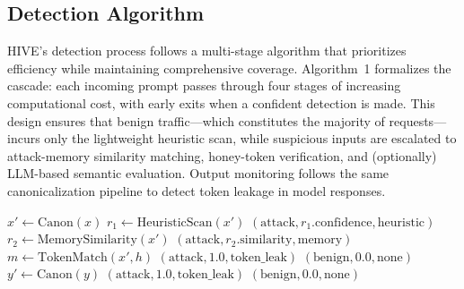 \documentclass[manuscript,screen,review]{acmart}
\begin{document}
\subsection{Detection Algorithm}
HIVE's detection process follows a multi-stage algorithm that prioritizes efficiency while maintaining comprehensive coverage. Algorithm~1 formalizes the cascade: each incoming prompt passes through four stages of increasing computational cost, with early exits when a confident detection is made. This design ensures that benign traffic---which constitutes the majority of requests---incurs only the lightweight heuristic scan, while suspicious inputs are escalated to attack-memory similarity matching, honey-token verification, and (optionally) LLM-based semantic evaluation. Output monitoring follows the same canonicalization pipeline to detect token leakage in model responses.

\begin{algorithm}[!htbp]
\caption{HIVE Detection Pipeline: Input and Output Monitoring}
\label{alg:detection-pipeline}
\begin{algorithmic}[1]
\State $x' \gets \mathrm{Canon}(x)$ 
\Statex
\State {}
\State $r_1 \gets \mathrm{HeuristicScan}(x')$ 
    \State \Return $(\mathrm{attack}, r_1.\mathrm{confidence}, \mathrm{heuristic})$ 
\EndIf
\Statex
\State {}
\State $r_2 \gets \mathrm{MemorySimilarity}(x')$ 
    \State \Return $(\mathrm{attack}, r_2.\mathrm{similarity}, \mathrm{memory})$ 
\EndIf
\Statex
\State {}
\State $m \gets \mathrm{TokenMatch}(x', h)$ 
    \State \Return $(\mathrm{attack}, 1.0, \mathrm{token\_leak})$ 
\EndIf
\State \Return $(\mathrm{benign}, 0.0, \mathrm{none})$
\EndProcedure
\Statex
{}
\State $y' \gets \mathrm{Canon}(y)$ 
 
    \State \Return $(\mathrm{attack}, 1.0, \mathrm{token\_leak})$
\EndIf
\State \Return $(\mathrm{benign}, 0.0, \mathrm{none})$
\EndProcedure
\end{algorithmic}
\end{algorithm}
\end{document}
